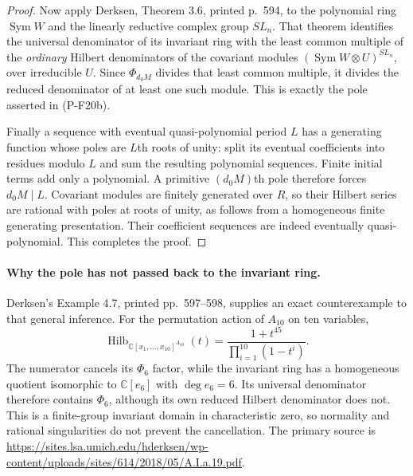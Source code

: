 \begin{proof}
Now apply Derksen, Theorem 3.6, printed p.~594, to the polynomial
ring $\operatorname{Sym}W$ and the linearly reductive complex group
$SL_n$. That theorem identifies the universal denominator of
its invariant ring with the least common multiple of the
\emph{ordinary} Hilbert denominators of the covariant modules
$(\operatorname{Sym}W\otimes U)^{SL_n}$, over irreducible $U$.
Since $\Phi_{d_0M}$ divides that least common multiple, it divides
the reduced denominator of at least one such module. This is
exactly the pole asserted in (P-F20b).

Finally a sequence with eventual quasi-polynomial period $L$
has a generating function whose poles are $L$th roots of unity:
split its eventual coefficients into residues modulo $L$ and
sum the resulting polynomial sequences. Finite initial terms
add only a polynomial. A primitive $(d_0M)$th pole therefore
forces $d_0M\mid L$. Covariant modules are finitely generated
over $R$, so their Hilbert series are rational with poles at
roots of unity, as follows from a homogeneous finite generating
presentation. Their coefficient sequences are indeed eventually
quasi-polynomial. This completes the proof.
\end{proof}

\paragraph{Why the pole has not passed back to the invariant ring.}
Derksen's Example 4.7, printed pp.~597--598, supplies an exact
counterexample to that general inference. For the permutation action
of $A_{10}$ on ten variables,
\[
 \operatorname{Hilb}_{\mathbb C[x_1,\ldots,x_{10}]^{A_{10}}}(t)
   =\frac{1+t^{45}}{\prod_{i=1}^{10}(1-t^i)}.
\]
The numerator cancels its $\Phi_6$ factor, while the invariant
ring has a homogeneous quotient isomorphic to $\mathbb C[e_6]$
with $\deg e_6=6$. Its universal denominator therefore contains
$\Phi_6$, although its own reduced Hilbert denominator does not.
This is a finite-group invariant domain in characteristic zero,
so normality and rational singularities do not prevent the
cancellation. The primary source is
\url{https://sites.lsa.umich.edu/hderksen/wp-content/uploads/sites/614/2018/05/A.I.a.19.pdf}.


